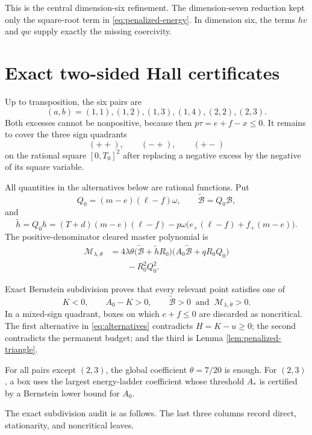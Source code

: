\documentclass[11pt]{article}
\theoremstyle{definition}
\begin{document}
This is the central dimension-six refinement.  The dimension-seven reduction
kept only the square-root term in \eqref{eq:penalized-energy}.  In dimension
six, the terms $hv$ and $qw$ supply exactly the missing coercivity.

\section{Exact two-sided Hall certificates}

Up to transposition, the six pairs are
\[
 (a,b)=(1,1),(1,2),(1,3),(1,4),(2,2),(2,3).
 \tag{5.1}\label{eq:six-pairs}
\]
Both excesses cannot be nonpositive, because then
$p\tau=e+f-x\le0$.  It remains to cover the three sign quadrants
\[
 (++),\qquad(-+),\qquad(+-)
\]
on the rational square $[0,T_0]^2$ after replacing a negative excess by the
negative of its square variable.

All quantities in the alternatives below are rational functions.  Put
\[
 Q_0=(m-e)(\ell-f)\omega,
 \qquad
 \widetilde{\mathcal B}=Q_0\mathcal B,
 \tag{5.2}\label{eq:Btilde}
\]
and
\[
 \widetilde h=Q_0h
 =(T+d)(m-e)(\ell-f)
 -p\omega\bigl(e_+(\ell-f)+f_+(m-e)\bigr).
 \tag{5.3}\label{eq:htilde}
\]
The positive-denominator cleared master polynomial is
\[
 \begin{aligned}
 \mathcal M_{\lambda,\theta}
 &=4\lambda\theta
 \bigl(\widetilde{\mathcal B}+\widetilde hR_0\bigr)
 \bigl(A_0\widetilde{\mathcal B}+qR_0Q_0\bigr)\\
 &\qquad-R_0^2Q_0^2.
 \end{aligned}
 \tag{5.4}\label{eq:Mpoly}
\]

Exact Bernstein subdivision proves that every relevant point satisfies one of
\[
 K<0,
 \qquad A_0-K>0,
 \qquad
 \widetilde{\mathcal B}>0\ \text{ and }\
 \mathcal M_{\lambda,\theta}>0.
 \tag{5.5}\label{eq:alternatives}
\]
In a mixed-sign quadrant, boxes on which $e+f\le0$ are discarded as
noncritical.  The first alternative in \eqref{eq:alternatives} contradicts
$H=K-u\ge0$; the second contradicts the permanent budget; and the third is
Lemma \ref{lem:penalized-triangle}.

For all pairs except $(2,3)$, the global coefficient $\theta=7/20$ is enough.
For $(2,3)$, a box uses the largest energy-ladder coefficient whose threshold
$A_*$ is certified by a Bernstein lower bound for $A_0$.

The exact subdivision audit is as follows.  The last three columns record
direct, stationarity, and noncritical leaves.
\end{document}
